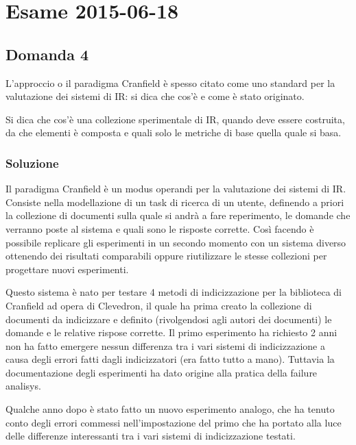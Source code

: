 
\section{Esame 2015-06-18}

\subsection{Domanda 4}

L'approccio o il paradigma Cranfield è spesso citato come uno standard per la valutazione dei sistemi di IR: si dica che cos'è e come è stato originato.

Si dica che cos'è una collezione sperimentale di IR, quando deve essere costruita, da che elementi è composta e quali solo le metriche di base quella quale si basa.

\subsubsection{Soluzione}

Il paradigma Cranfield è un modus operandi per la valutazione dei sistemi di IR. Consiste nella modellazione di un task di ricerca di un utente, definendo a priori la collezione di documenti sulla quale si andrà a fare reperimento, le domande che verranno poste al sistema e quali sono le risposte corrette.
Così facendo è possibile replicare gli esperimenti in un secondo momento con un sistema diverso ottenendo dei risultati comparabili oppure riutilizzare le stesse collezioni per progettare nuovi esperimenti.

Questo sistema è nato per testare 4 metodi di indicizzazione per la biblioteca di Cranfield ad opera di Clevedron, il quale ha prima creato la collezione di documenti da indicizzare e definito (rivolgendosi agli autori dei documenti) le domande e le relative rispose corrette. Il primo esperimento ha richiesto 2 anni non ha fatto emergere nessun differenza tra i vari sistemi di indicizzazione a causa degli errori fatti dagli indicizzatori (era fatto tutto a mano). Tuttavia la documentazione degli esperimenti ha dato origine alla pratica della failure analisys. 

Qualche anno dopo è stato fatto un nuovo esperimento analogo, che ha tenuto conto degli errori commessi nell'impostazione del primo che ha portato alla luce delle differenze interessanti tra i vari sistemi di indicizzazione testati.

